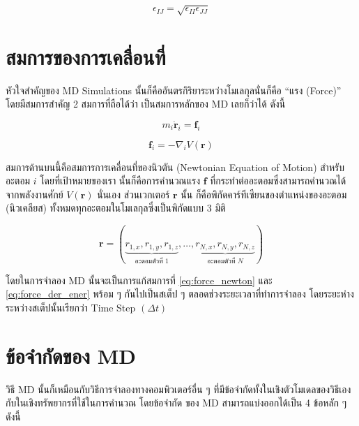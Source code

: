 \begin{equation}
  \epsilon_{IJ}
  =
  \sqrt{\epsilon_{II} \epsilon_{JJ}}
\end{equation}

\section{สมการของการเคลื่อนที่}

หัวใจสำคัญของ MD Simulations นั้นก็คืออันตรกิริยาระหว่างโมเลกุลนั่นก็คือ \enquote{แรง (Force)} โดยมีสมการสำคัญ 2 สมการที่ถือได้ว่า%
เป็นสมการหลักของ MD เลยก็ว่าได้ ดังนี้

\begin{equation}
  \label{eq:force_newton}
  m_{i}\bm{\ddot{r}}_{i} = \bm{f}_{i}
\end{equation}

\begin{equation}
  \label{eq:force_der_ener}
  \bm{f}_{i} = -\nabla_{i}V(\bm{r})
\end{equation}

\noindent สมการด้านบนนี้คือสมการการเคลื่อนที่ของนิวตัน (Newtonian Equation of Motion) สำหรับอะตอม $i$ โดยที่เป้าหมายของเรา%
นั้นก็คือการคำนวณแรง $\bm{f}$ ที่กระทำต่ออะตอมซึ่งสามารถคำนวณได้จากพลังงานศักย์ $V(\bm{r})$ นั่นเอง ส่วนเวกเตอร์ $\bm{r}$ นั้น%
ก็คือพิกัดคาร์ทีเซียนของตำแหน่งของอะตอม (นิวเคลียส) ทั้งหมดทุกอะตอมในโมเลกุลซึ่งเป็นพิกัดแบบ 3 มิติ

\begin{equation}
  \bm{r} = (\underbrace{r_{1,x}, r_{1,y}, r_{1,z}}_{\text{อะตอมตัวที่ 1}}, \dots,
  \underbrace{r_{N,x}, r_{N,y}, r_{N,z}}_{\text{อะตอมตัวที่ $N$}})
\end{equation}

โดยในการจำลอง MD นั้นจะเป็นการแก้สมการที่ \eqref{eq:force_newton} และ \eqref{eq:force_der_ener} พร้อม ๆ กันไปเป็นสเต็ป ๆ
ตลอดช่วงระยะเวลาที่ทำการจำลอง โดยระยะห่างระหว่างสเต็ปนั้นเรียกว่า Time Step $(\Delta t)$

\section{ข้อจำกัดของ MD}

วิธี MD นั้นก็เหมือนกับวิธีการจำลองทางคอมพิวเตอร์อื่น ๆ ที่มีข้อจำกัดทั้งในเชิงตัวโมเดลของวิธีเองกับในเชิงทรัพยากรที่ใช้ในการคำนวณ โดยข้อจำกัด%
ของ MD สามารถแบ่งออกได้เป็น 4 ข้อหลัก ๆ ดังนี้

